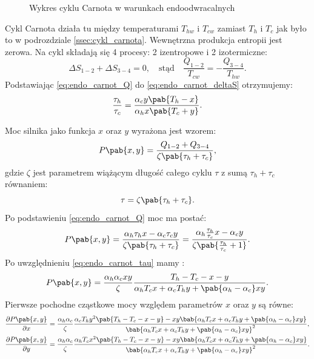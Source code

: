 \begin{figure}[htp]
	\centering
	
	\caption{Wykres cyklu Carnota w warunkach endoodwracalnych}
\end{figure}

Cykl Carnota działa tu między temperaturami \(T_{hw}\) i \(T_{cw}\) zamiast \(T_{h}\) i \(T_{c}\) jak było to w podrozdziale \ref{ssec:cykl_carnota}. Wewnętrzna produkcja entropii jest zerowa. Na cykl składają się 4 procesy: 2 izentropowe i 2 izotermiczne:
\begin{equation}\label{eq:endo_carnot_deltaS}
	\Delta S_{1-2} + \Delta S_{3-4} = 0, \quad\text{stąd}\quad
	\frac{Q_{1-2}}{T_{cw}} = - \frac{Q_{3-4}}{T_{hw}}.
\end{equation}
Podstawiając \eqref{eq:endo_carnot_Q} do \eqref{eq:endo_carnot_deltaS} otrzymujemy:
\begin{equation}\label{eq:endo_carnot_tau}
	\frac{\tau_{h}}{\tau_{c}} = \frac{\alpha_{c} y \pab{T_{h} - x}}{\alpha_{h} x \pab{T_{c} + y}}.
\end{equation}

Moc silnika jako funkcja \(x\) oraz \(y\) wyrażona jest wzorem:
\begin{equation}
	P\pab{x,y} = \frac{Q_{1-2} + Q_{3-4}}{\zeta\pab{\tau_{h} + \tau_{c}}},
\end{equation}
gdzie \(\zeta\) jest parametrem wiążącym długość całego cyklu \(\tau\) z sumą \(\tau_{h} + \tau_{c}\) równaniem:
\begin{equation}
	\tau = \zeta\pab{\tau_h + \tau_c}.
\end{equation}
Po podstawieniu \eqref{eq:endo_carnot_Q} moc ma postać:
\begin{equation}
	P\pab{x,y} =
	\frac{\alpha_{h}\tau_{h}x - \alpha_{c}\tau_{c}y}{\zeta\pab{\tau_h + \tau_c}} =
	\frac{\alpha_{h}\frac{\tau_h}{\tau_c}x - \alpha_{c}y}{\zeta\pab{\frac{\tau_h}{\tau_c} + 1}}.
\end{equation}
Po uwzględnieniu \eqref{eq:endo_carnot_tau} mamy \cite{curzon}:
\begin{equation}\label{eq:endo_carnot_P}
	P\pab{x,y} = \frac{\alpha_{h}\alpha_{c}xy}{\zeta} \frac{T_{h} - T_{c} - x - y}{\alpha_{h}T_{c}x + \alpha_{c}T_{h}y + \pab{\alpha_{h} - \alpha_{c}}xy}.
\end{equation}
Pierwsze pochodne cząstkowe mocy względem parametrów \(x\) oraz \(y\) są równe:
\begin{equation}\label{eq:endo_carnot_pdvPxy}
\begin{split}
	\pdv{P\pab{x,y}}{x} &= 
	\frac{\alpha_{h}\alpha_{c}}{\zeta} \frac{
	\alpha_{c}T_{h}y^2 \pab{T_{h}-T_{c}-x-y} - xy\bab{\alpha_{h}T_{c}x + \alpha_{c}T_{h}y + \pab{\alpha_{h}-\alpha_{c}}xy}
	}{\bab{\alpha_{h}T_{c}x + \alpha_{c}T_{h}y + \pab{\alpha_{h}-\alpha_{c}}xy}^2}, \\
	\pdv{P\pab{x,y}}{y} &= 
	\frac{\alpha_{h}\alpha_{c}}{\zeta} \frac{
	\alpha_{h}T_{c}x^2 \pab{T_{h}-T_{c}-x-y} - xy\bab{\alpha_{h}T_{c}x + \alpha_{c}T_{h}y + \pab{\alpha_{h}-\alpha_{c}}xy}
	}{\bab{\alpha_{h}T_{c}x + \alpha_{c}T_{h}y + \pab{\alpha_{h}-\alpha_{c}}xy}^2}.
\end{split}
\end{equation}

